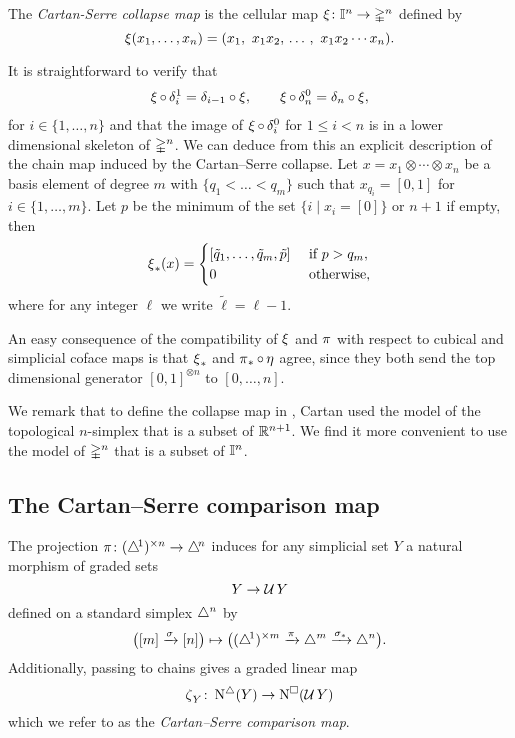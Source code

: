 \begin{definition}
	The \textit{Cartan-Serre collapse map} is the cellular map $\operatorname{\xi} \colon \mathbb{I}^n \to \mathbb{\Delta}^n$ defined by
	\[
	\operatorname{\xi}(x_1, \dots, x_n) = (x_1,\ x_1 x_2, \, \dots \, , \ x_1 x_2 \dotsm x_n).
	\]
\end{definition}

It is straightforward to verify that
\begin{align*}
\operatorname{\xi} \circ \, \delta_i^1 = \delta_{i-1} \circ \operatorname{\xi}, \qquad
\operatorname{\xi} \circ \, \delta_n^0 = \delta_n \circ \operatorname{\xi},
\end{align*}
for $i \in \{1, \dots, n\}$ and that the image of $\operatorname{\xi} \circ \, \delta_i^0$ for $1 \leq i < n$ is in a lower dimensional skeleton of $\mathbb{\Delta}^n$.
We can deduce from this an explicit description of the chain map induced by the Cartan--Serre collapse.
Let $x = x_1 \otimes \cdots \otimes x_n$ be a basis element of degree $m$ with $\{q_1 < \dots < q_m\}$ such that $x_{q_i} = [0,1]$ for $i \in \{1, \dots, m\}$.
Let $p$ be the minimum of the set $\{i \mid x_i = [0]\}$ or $n+1$ if empty, then
\[
\operatorname{\xi}_\ast(x) = \begin{cases}
[\tilde q_1, \dots, \tilde q_m, \tilde p] & \text{ if } p > q_m, \\
0 & \text{ otherwise},
\end{cases}
\]
where for any integer $\ell$ we write $\tilde \ell = \ell-1$.

An easy consequence of the compatibility of $\operatorname{\xi}$ and $\operatorname{\pi}$ with respect to cubical and simplicial coface maps is that $\operatorname{\xi}_\ast$ and $\operatorname{\pi}_\ast \circ \operatorname{\eta}$ agree, since they both send the top dimensional generator $[0,1]^{\otimes n}$ to $[0, \dots, n]$.

We remark that to define the collapse map in \cite[p. 442]{serre1951homologie}, Cartan used the model of the topological $n$-simplex that is a subset of $\mathbb{R}^{n+1}$.
We find it more convenient to use the model of $\mathbb{\Delta}^n$ that is a subset of $\mathbb{I}^n$.

\subsection{The Cartan--Serre comparison map} \label{ss:comparison map}

The projection $\operatorname{\pi} \colon (\triangle^{\!1})^{\times n} \to \triangle^{\!n}$ induces for any simplicial set $Y$ a natural morphism of graded sets
\[
Y \to \operatorname{\mathcal{U}} Y
\]
defined on a standard simplex $\triangle^n$ by
\[
\big( [m] \xrightarrow{\sigma} [n] \big) \mapsto
\big( (\triangle^{\!1})^{\times m} \xrightarrow{\operatorname{\pi}} \triangle^m \xrightarrow{\sigma_\ast} \triangle^n \big).
\]
Additionally, passing to chains gives a graded linear map
\[
\operatorname{\zeta}_Y \colon \operatorname{N^{\triangle}}(Y) \to \operatorname{N^{\square}}(\operatorname{\mathcal{U}} Y)
\]
which we refer to as the \textit{Cartan--Serre comparison map}.

